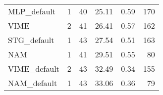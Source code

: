 \begin{tabular}{lrrrrr}
MLP_default                &            1 &  40 &  25.11 &                     0.59 &   170 \\
VIME                       &            2 &  41 &  26.41 &                     0.57 &   162 \\
STG_default                &            1 &  43 &  27.54 &                     0.51 &   163 \\
NAM                        &            1 &  41 &  29.51 &                     0.55 &    80 \\
VIME_default               &            2 &  43 &  32.49 &                     0.34 &   155 \\
NAM_default                &            1 &  43 &  33.06 &                     0.36 &    79 \\
\bottomrule
\end{tabular}
